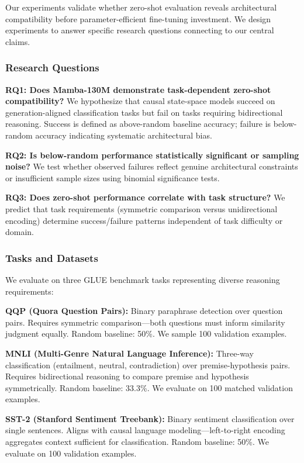 
Our experiments validate whether zero-shot evaluation reveals architectural compatibility before parameter-efficient fine-tuning investment. We design experiments to answer specific research questions connecting to our central claims.

\subsubsection{Research Questions}

\textbf{RQ1: Does Mamba-130M demonstrate task-dependent zero-shot compatibility?} We hypothesize that causal state-space models succeed on generation-aligned classification tasks but fail on tasks requiring bidirectional reasoning. Success is defined as above-random baseline accuracy; failure is below-random accuracy indicating systematic architectural bias.

\textbf{RQ2: Is below-random performance statistically significant or sampling noise?} We test whether observed failures reflect genuine architectural constraints or insufficient sample sizes using binomial significance tests.

\textbf{RQ3: Does zero-shot performance correlate with task structure?} We predict that task requirements (symmetric comparison versus unidirectional encoding) determine success/failure patterns independent of task difficulty or domain.

\subsubsection{Tasks and Datasets}

We evaluate on three GLUE benchmark tasks representing diverse reasoning requirements:

\textbf{QQP (Quora Question Pairs):} Binary paraphrase detection over question pairs. Requires symmetric comparison---both questions must inform similarity judgment equally. Random baseline: 50\%. We sample 100 validation examples.

\textbf{MNLI (Multi-Genre Natural Language Inference):} Three-way classification (entailment, neutral, contradiction) over premise-hypothesis pairs. Requires bidirectional reasoning to compare premise and hypothesis symmetrically. Random baseline: 33.3\%. We evaluate on 100 matched validation examples.

\textbf{SST-2 (Stanford Sentiment Treebank):} Binary sentiment classification over single sentences. Aligns with causal language modeling---left-to-right encoding aggregates context sufficient for classification. Random baseline: 50\%. We evaluate on 100 validation examples.

